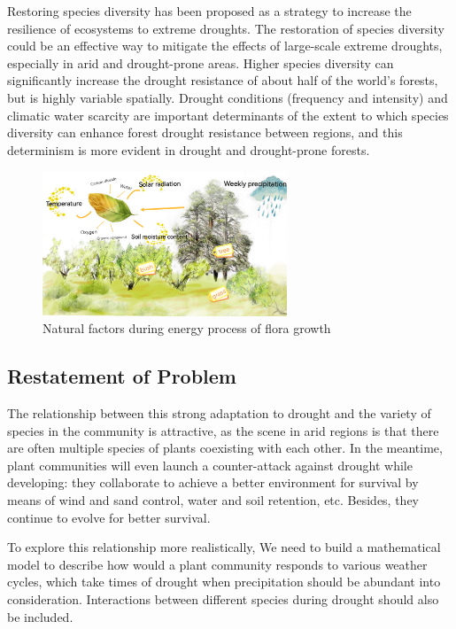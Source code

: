 \documentclass[12pt]{article}  %
\begin{document}
Restoring species diversity has been proposed as a strategy to increase the resilience of ecosystems to extreme droughts{\cite{1}}. The restoration of species diversity could be an effective way to mitigate the effects of large-scale extreme droughts, especially in arid and drought-prone areas. Higher species diversity can significantly increase the drought resistance of about half of the world's forests, but is highly variable spatially. Drought conditions (frequency and intensity) and climatic water scarcity are important determinants of the extent to which species diversity can enhance forest drought resistance between regions, and this determinism is more evident in drought and drought-prone forests.

\vspace{-0.3cm}
\begin{figure}[htbp]
	\centering
	\includegraphics[width=0.65\textwidth]{easymcm/img/LTReview.pdf}
	\caption{Natural factors during energy process of flora growth}\label{fig:work1}
\end{figure}


\vspace{-1cm}
\subsection{Restatement of Problem}
\vspace{-0.3cm}
The relationship between this strong adaptation to drought and the variety of species in the community is attractive, as the scene in arid regions is that there are often multiple species of plants coexisting with each other. In the meantime, plant communities will even launch a counter-attack against drought while developing: they collaborate to achieve a better environment for survival by means of wind and sand control, water and soil retention, etc. Besides, they continue to evolve for better survival.

To explore this relationship more realistically, We need to build a mathematical model to describe how would a plant community responds to various weather cycles, which take times of drought when precipitation should be abundant into consideration.  Interactions between different species during drought should also be included.
\end{document}
